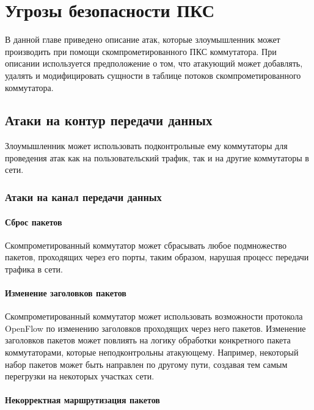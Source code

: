 \documentclass[../thesis.tex]{subfiles}
\begin{document}
\chapter{Угрозы безопасности ПКС} \label{chapter:classification}

В данной главе приведено описание атак, которые злоумышленник может производить при помощи скомпрометированного ПКС коммутатора.
При описании используется предположение о том, что атакующий может добавлять, удалять и модифицировать сущности в таблице потоков скомпрометированного коммутатора.

\section{Атаки на контур передачи данных}

Злоумышленник может использовать подконтрольные ему коммутаторы для проведения атак как на пользовательский трафик, так и на другие коммутаторы в сети.

\subsection{Атаки на канал передачи данных}

\subsubsection{Сброс пакетов}

Скомпрометированный коммутатор может сбрасывать любое подмножество пакетов, проходящих через его порты, таким образом, нарушая процесс передачи трафика в сети.

\subsubsection{Изменение заголовков пакетов}

Скомпрометированный коммутатор может использовать возможности протокола OpenFlow по изменению заголовков проходящих через него пакетов.
Изменение заголовков пакетов может повлиять на логику обработки конкретного пакета коммутаторами, которые неподконтрольны атакующему.
Например, некоторый набор пакетов может быть направлен по другому пути, создавая тем самым перегрузки на некоторых участках сети.

\subsubsection{Некорректная маршрутизация пакетов}
\end{document}
